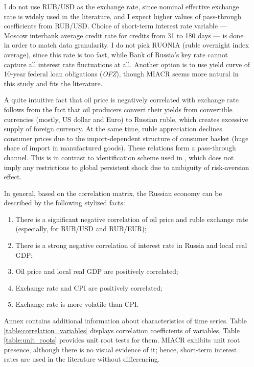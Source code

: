 \documentclass[12pt, a4paper]{extarticle}
\begin{document}
I do not use RUB/USD as the exchange rate, since nominal effective exchange rate is widely used in the literature, and I expect higher values of pass-through coefficients from RUB/USD. Choice of short-term interest rate variable --- Moscow interbank average credit rate for credits from 31 to 180 days --- is done in order to match data granularity. I do not pick RUONIA (ruble overnight index average), since this rate is too fast, while Bank of Russia's key rate cannot capture all interest rate fluctuations at all. Another option is to use yield curve of 10-year federal loan obligations (\textit{OFZ}), though MIACR seems more natural in this study and fits the literature.

A quite intuitive fact that oil price is negatively correlated with exchange rate follows from the fact that oil producers convert their yields from convertible currencies (mostly, US dollar and Euro) to Russian ruble, which creates excessive supply of foreign currency. At the same time, ruble appreciation declines consumer prices due to the import-dependent structure of consumer basket (huge share of import in manufactured goods). These relations form a pass-through channel. This is in contrast to identification scheme used in \parencite{Forbes2018}, which does not imply any restrictions to global persistent shock due to ambiguity of risk-aversion effect.

In general, based on the correlation matrix, the Russian economy can be described by the following stylized facts:
\begin{enumerate}
	\setlength\itemsep{0.02em}
	\item There is a significant negative correlation of oil price and ruble exchange rate (especially, for RUB/USD and RUB/EUR);
	\item There is a strong negative correlation of interest rate in Russia and local real GDP;
	\item Oil price and local real GDP are positively correlated;
	\item Exchange rate and CPI are positively correlated;
	\item Exchange rate is more volatile than CPI.
\end{enumerate}

Annex contains additional information about characteristics of time series. Table \ref{table:correlation_variables} displays correlation coefficients of variables, Table \ref{table:unit_roots} provides unit root tests for them. \mbox{MIACR} exhibits unit root presence, although there is no visual evidence of it; hence, short-term interest rates are used in the literature without differencing. 
\end{document}
